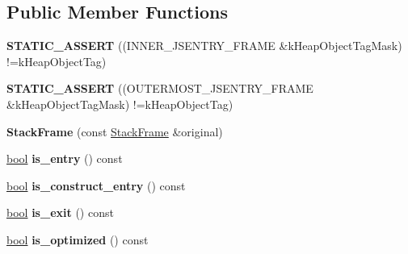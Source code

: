 \subsection*{Public Member Functions}
\begin{DoxyCompactItemize}
\item 
\mbox{\label{classv8_1_1internal_1_1StackFrame_a5938b969c181d07c5377ab1c36b77148}} 
{\bfseries S\+T\+A\+T\+I\+C\+\_\+\+A\+S\+S\+E\+RT} ((I\+N\+N\+E\+R\+\_\+\+J\+S\+E\+N\+T\+R\+Y\+\_\+\+F\+R\+A\+ME \&k\+Heap\+Object\+Tag\+Mask) !=k\+Heap\+Object\+Tag)
\item 
\mbox{\label{classv8_1_1internal_1_1StackFrame_a5144b19ee390190e6c5abc43eafd1479}} 
{\bfseries S\+T\+A\+T\+I\+C\+\_\+\+A\+S\+S\+E\+RT} ((O\+U\+T\+E\+R\+M\+O\+S\+T\+\_\+\+J\+S\+E\+N\+T\+R\+Y\+\_\+\+F\+R\+A\+ME \&k\+Heap\+Object\+Tag\+Mask) !=k\+Heap\+Object\+Tag)
\item 
\mbox{\label{classv8_1_1internal_1_1StackFrame_afb58d576091921c8587a632b3ef0527e}} 
{\bfseries Stack\+Frame} (const \mbox{\hyperlink{classv8_1_1internal_1_1StackFrame}{Stack\+Frame}} \&original)
\item 
\mbox{\label{classv8_1_1internal_1_1StackFrame_aa0ea94203137e8d2c6f14b0cd92bda1b}} 
\mbox{\hyperlink{classbool}{bool}} {\bfseries is\+\_\+entry} () const
\item 
\mbox{\label{classv8_1_1internal_1_1StackFrame_accd220077ba1b11a0d7d26867b53cd29}} 
\mbox{\hyperlink{classbool}{bool}} {\bfseries is\+\_\+construct\+\_\+entry} () const
\item 
\mbox{\label{classv8_1_1internal_1_1StackFrame_aa9aa2ce70abc47cb6166786aa85c0778}} 
\mbox{\hyperlink{classbool}{bool}} {\bfseries is\+\_\+exit} () const
\item 
\mbox{\label{classv8_1_1internal_1_1StackFrame_aaac70f1efdd1281a4d11e833d66ef63b}} 
\mbox{\hyperlink{classbool}{bool}} {\bfseries is\+\_\+optimized} () const
\item 
\mbox{\label{classv8_1_1internal_1_1StackFrame_adac92b9b79f68c55461e4a770c5ca3ce}} 

\end{DoxyCompactItemize}
